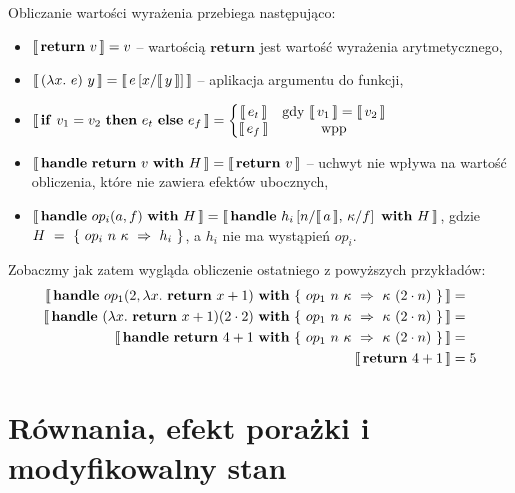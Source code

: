 \documentclass[shortabstract]{iithesis}
\begin{document}
Obliczanie wartości wyrażenia przebiega następująco:
\begin{itemize}
\item \(\llbracket\, \mathbf{return}\ v\, \rrbracket = v\) -- wartością \(\mathbf{return}\) jest wartość wyrażenia arytmetycznego,
\item \(\llbracket\, (\lambda x.\ e)\ y\, \rrbracket = \llbracket\, e \left[x / \llbracket\, y\, \rrbracket\right]\, \rrbracket\) -- aplikacja argumentu do funkcji,
\item
  \(\begin{aligned}[t]
    \llbracket\, \mathbf{if}\ v_1 = v_2\ \mathbf{then}\ e_t\ \mathbf{else}\ e_f\, \rrbracket = \left\{\begin{matrix}
    \llbracket\, e_t\, \rrbracket & \text{gdy }\llbracket\, v_1\, \rrbracket = \llbracket\, v_2\, \rrbracket \\ 
    \llbracket\, e_f\, \rrbracket & \text{wpp}
    \end{matrix}\right.
  \end{aligned}\)
\item \(\llbracket\, \mathbf{handle}\ \mathbf{return}\ v\ \mathbf{with}\ H\, \rrbracket = \llbracket\, \mathbf{return}\ v\, \rrbracket\) -- uchwyt nie wpływa na wartość obliczenia, które nie zawiera efektów ubocznych,
\item \(\llbracket\, \mathbf{handle}\ op_{i}(a, f)\ \mathbf{with}\ H\, \rrbracket = \llbracket\, \mathbf{handle}\ h_i \left[n / \llbracket\, a\, \rrbracket,\, \kappa / f\right]\ \mathbf{with}\ H\, \rrbracket \), gdzie \(H~=~\{\ \hcase{op_i}{n\ \kappa}{h_i} \ \}\), a \(h_i\) nie ma wystąpień \(op_i\).
  
\end{itemize}

Zobaczmy jak zatem wygląda obliczenie ostatniego z powyższych przykładów:
\begin{equation}\begin{split}
  \eval{\handle{\opi{1}{2}{\fun{x}{\return{x + 1}}}}{\{\ \hcase{op_1}{n\ \kappa}{\kappa\ (2 \cdot n)} \ \}}} &= \\
  \eval{\handle{(\fun{x}{\return{x+1}}) (2 \cdot 2)}{\{\ \hcase{op_1}{n\ \kappa}{\kappa\ (2 \cdot n)} \ \}}} &= \\
  \eval{\handle{\return{4+1}}{\{\ \hcase{op_1}{n\ \kappa}{\kappa\ (2 \cdot n)} \ \}}} &= \\
  \eval{\return{4 + 1}} &= 5
\end{split}\end{equation}


\section{Równania, efekt porażki i modyfikowalny stan}
\end{document}
